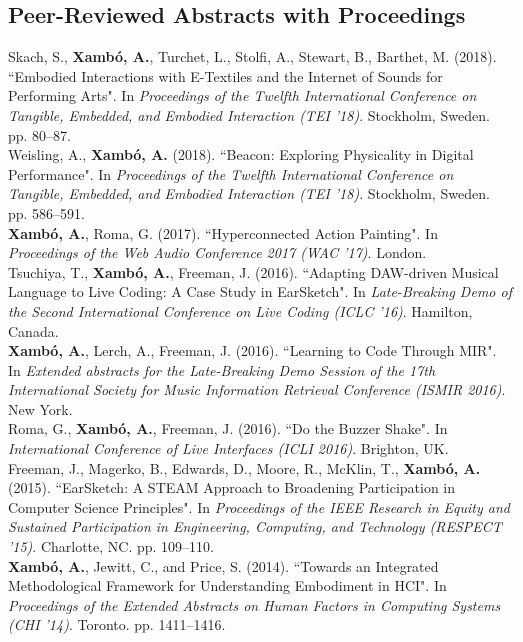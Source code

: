 \documentclass[10pt, a4paper]{article}
\newcommand{\years}[1]{\marginnote{\scriptsize #1}}
\begin{document}
\subsection*{Peer-Reviewed Abstracts with Proceedings}
\noindent
\years{2018b}Skach, S., \textbf{Xambó, A.}, Turchet, L., Stolfi, A., Stewart, B., Barthet, M. (2018). “Embodied Interactions with E-Textiles and the Internet of Sounds for Performing Arts". In \emph{Proceedings of the Twelfth International Conference on Tangible, Embedded, and Embodied Interaction (TEI '18)}. Stockholm, Sweden. pp. 80--87.\\
\years{2018a}Weisling, A., \textbf{Xambó, A.} (2018). “Beacon: Exploring Physicality in Digital Performance". In \emph{Proceedings of the Twelfth International Conference on Tangible, Embedded, and Embodied Interaction (TEI '18)}. Stockholm, Sweden. pp. 586--591.\\
\years{2017a}\textbf{Xambó, A.}, Roma, G. (2017). “Hyperconnected Action Painting". In \emph{Proceedings of the Web Audio Conference 2017 (WAC '17)}. London.\\
\years{2016c}Tsuchiya, T., \textbf{Xambó, A.}, Freeman, J. (2016). “Adapting DAW-driven Musical Language to Live Coding: A Case Study in EarSketch". In \emph{Late-Breaking Demo of the Second International Conference on Live Coding (ICLC '16)}. Hamilton, Canada.\\ 
\years{2016b}\textbf{Xambó, A.}, Lerch, A., Freeman, J. (2016). “Learning to Code Through MIR". In \emph{Extended abstracts for the Late-Breaking Demo Session of the 17th International Society for Music Information Retrieval Conference (ISMIR 2016)}. New York.\\
\years{2016a}Roma, G., \textbf{Xambó, A.}, Freeman, J. (2016). “Do the Buzzer Shake". In \emph{International Conference of Live Interfaces (ICLI 2016)}. Brighton, UK.\\
\years{2015}Freeman, J., Magerko, B., Edwards, D., Moore, R., McKlin, T., \textbf{Xambó, A.} (2015). “EarSketch: A STEAM Approach to Broadening Participation in Computer Science Principles". In \emph{Proceedings of the IEEE Research in Equity and Sustained Participation in Engineering, Computing, and Technology (RESPECT '15)}. Charlotte, NC. pp. 109--110.\\
\years{2014}\textbf{Xambó, A.}, Jewitt, C., and Price, S. (2014). “Towards an Integrated Methodological Framework for Understanding Embodiment in HCI". In \emph{Proceedings of the Extended Abstracts on Human Factors in Computing Systems (CHI '14)}. Toronto. pp. 1411--1416.\\
\end{document}
